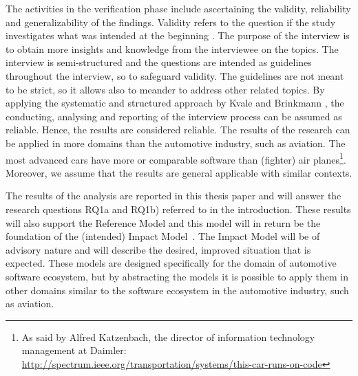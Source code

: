  The activities in the verification phase include ascertaining the validity, reliability and generalizability of the findings. Validity refers to the question if the study investigates what was intended at the beginning \cite{Kvale2015Interviews}. The purpose of the interview is to obtain more insights and knowledge from the interviewee on the topics. The interview is semi-structured and the questions are intended as guidelines throughout the interview, so to safeguard validity. The guidelines are not meant to be strict, so it allows also to meander to address other related topics. By applying the systematic and structured approach by Kvale and Brinkmann \cite{Kvale2015Interviews}, the conducting, analysing and reporting of the interview process can be assumed as reliable. Hence, the results are considered reliable. The results of the research can be applied in more domains than the automotive industry, such as aviation. The most advanced cars have more or comparable software than (fighter) air planes\footnote{As said by Alfred Katzenbach, the director of information
technology management at Daimler: \url{http://spectrum.ieee.org/transportation/systems/this-car-runs-on-code}}. Moreover, we assume that the results are general applicable with similar contexts. 

 The results of the analysis are reported in this thesis paper and will answer the research questions RQ1a and RQ1b) referred to in the introduction. These results will also support the Reference Model and this model will in return be the foundation of the (intended) Impact Model~\cite{Blessing:2009:DDR:1717807}. The Impact Model will be of advisory nature and will describe the desired, improved situation that is expected. These models are designed specifically for the domain of automotive software ecosystem, but by abstracting the models it is possible to apply them in other domains similar to the software ecosystem in the automotive industry, such as aviation.

